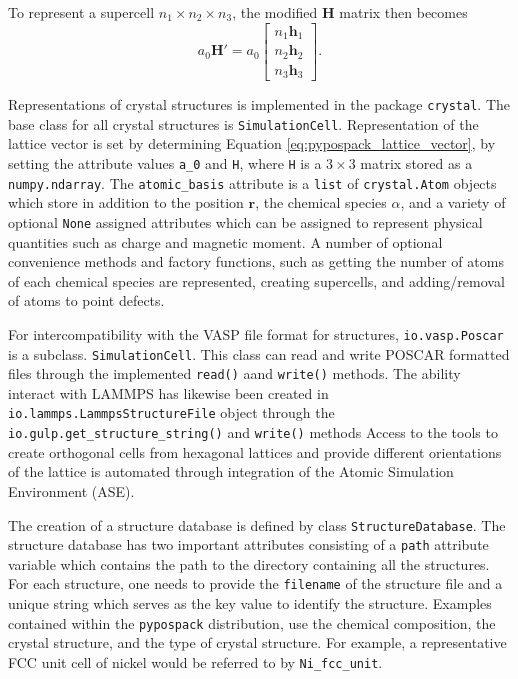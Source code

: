 To represent a supercell $n_1 \times n_2 \times n_3$, the modified $\bm{H}$ matrix then becomes
\begin{equation}
\label{eq:pypospack_supercell_representation}
	a_0 \bm{H}'
	=
	a_0 \begin{bmatrix}
	        n_1 \bm{h}_1 \\
					n_2 \bm{h}_2 \\
					n_3 \bm{h}_3
			\end{bmatrix}.
\end{equation}

Representations of crystal structures is implemented in the package \verb|crystal|.  The base class for all crystal structures is \verb|SimulationCell|.  Representation of the lattice vector is set by determining Equation \ref{eq:pypospack_lattice_vector}, by setting the attribute values \verb|a_0| and \verb|H|, where \verb|H| is a $3 \times 3$ matrix stored as a \verb|numpy.ndarray|.  The \verb|atomic_basis| attribute is a \verb|list| of \verb|crystal.Atom| objects which store in addition to the position $\bm{r}$, the chemical species $\alpha$, and a variety of optional \verb|None| assigned attributes which can be assigned to represent physical quantities such as charge and magnetic moment.  A number of optional convenience methods and factory functions, such as getting the number of atoms of each chemical species are represented, creating supercells, and adding/removal of atoms to point defects.

For intercompatibility with the VASP file format for structures, \verb|io.vasp.Poscar| is a subclass. \verb|SimulationCell|.  This class can read and write POSCAR formatted files through the implemented \verb|read()| aand \verb|write()| methods.
The ability interact with LAMMPS has likewise been created in \verb|io.lammps.LammpsStructureFile| object through the \verb|io.gulp.get_structure_string()| and \verb|write()| methods
Access to the tools to create orthogonal cells from hexagonal lattices and provide different orientations of the lattice is automated through integration of the Atomic Simulation Environment (ASE)\cite{larsen2017_ase}.

The creation of a structure database is defined by class \verb|StructureDatabase|.  The structure database has two important attributes consisting of a \verb|path| attribute variable which contains the path to the directory containing all the structures.  For each structure, one needs to provide the \verb|filename| of the structure file and a unique string which serves as the key value to identify the structure.  Examples contained within the \verb|pypospack| distribution, use the chemical composition, the crystal structure, and the type of crystal structure.  For example, a representative FCC unit cell of nickel would be referred to by \verb|Ni_fcc_unit|.

